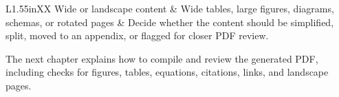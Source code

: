 \begin{table}[htb]
\begin{ndsudatatable}[headers={1}]
\begin{tabularx}{\textwidth}{L{1.55in}XX}
Wide or landscape content & Wide tables, large figures, diagrams, schemas, or rotated pages & Decide whether the content should be simplified, split, moved to an appendix, or flagged for closer PDF review. \\
\bottomrule
\end{tabularx}
\end{ndsudatatable}

\end{table}

The next chapter explains how to compile and review the generated PDF, including checks for figures, tables, equations, citations, links, and landscape pages.
